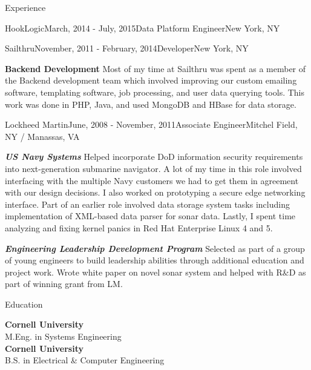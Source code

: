 \documentclass{resume} %
\begin{document}
\begin{rSection}{Experience}
\begin{rSubsection}{HookLogic}{March, 2014 - July, 2015}{Data Platform Engineer}{New York, NY}
  \end{rSubsection}

  \begin{rSubsection}{Sailthru}{November, 2011 - February, 2014}{Developer}{New York, NY}
  \item \textbf{Backend Development} Most of my time at Sailthru was spent as a member of the Backend development team which involved improving our custom emailing software, templating software, job processing, and user data querying tools. This work was done in PHP, Java, and used MongoDB and HBase for data storage.
  \end{rSubsection}


  \begin{rSubsection}{Lockheed Martin}{June, 2008 - November, 2011}{Associate Engineer}{Mitchel Field, NY / Manassas, VA}
  \item \textbf{\textit{US Navy Systems}} Helped incorporate DoD information security requirements into next-generation submarine navigator. A lot of my time in this role involved interfacing with the multiple Navy customers we had to get them in agreement with our design decisions. I also worked on prototyping a secure edge networking interface. Part of an earlier role involved data storage system tasks including implementation of XML-based data parser for sonar data. Lastly, I spent time analyzing and fixing kernel panics in Red Hat Enterprise Linux 4 and 5.
  \item \textbf{\textit{Engineering Leadership Development Program}} Selected
    as part of a group of young engineers to build leadership abilities through
    additional education and project work. Wrote white paper on novel sonar
    system and helped with R\&D as part of winning grant from LM.
  \end{rSubsection}

\end{rSection}


\begin{rSection}{Education}

  {\bf Cornell University} \\ 
  M.Eng. in Systems Engineering \\

  {\bf Cornell University} \\ 
  B.S. in Electrical \& Computer Engineering \\
\end{rSection}
\end{document}
